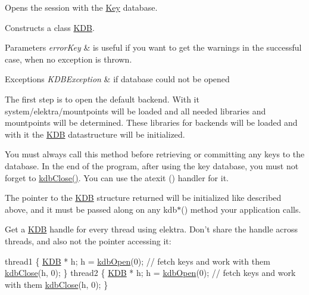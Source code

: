 Opens the session with the \hyperlink{classkdb_1_1Key}{Key} database.  

Constructs a class \hyperlink{classkdb_1_1KDB}{K\-D\-B}.


\begin{DoxyParams}{Parameters}
{\em error\-Key} & is useful if you want to get the warnings in the successful case, when no exception is thrown.\\
\hline
\end{DoxyParams}

\begin{DoxyExceptions}{Exceptions}
{\em K\-D\-B\-Exception} & if database could not be opened\\
\hline
\end{DoxyExceptions}
The first step is to open the default backend. With it system/elektra/mountpoints will be loaded and all needed libraries and mountpoints will be determined. These libraries for backends will be loaded and with it the {\ttfamily \hyperlink{classkdb_1_1KDB}{K\-D\-B}} datastructure will be initialized.

You must always call this method before retrieving or committing any keys to the database. In the end of the program, after using the key database, you must not forget to \hyperlink{group__kdb_gadb54dc9fda17ee07deb9444df745c96f}{kdb\-Close()}. You can use the atexit () handler for it.

The pointer to the {\ttfamily \hyperlink{classkdb_1_1KDB}{K\-D\-B}} structure returned will be initialized like described above, and it must be passed along on any kdb$\ast$() method your application calls.

Get a {\ttfamily \hyperlink{classkdb_1_1KDB}{K\-D\-B}} handle for every thread using elektra. Don't share the handle across threads, and also not the pointer accessing it\-: 
\begin{DoxyCode}
thread1
\{
        \hyperlink{classkdb_1_1KDB_a7e0637995ce9f294cdbc6f167df6db40}{KDB} * h;
        h = \hyperlink{group__kdb_ga6808defe5870f328dd17910aacbdc6ca}{kdbOpen}(0);
        \textcolor{comment}{// fetch keys and work with them}
        \hyperlink{group__kdb_gadb54dc9fda17ee07deb9444df745c96f}{kdbClose}(h, 0);
\}
thread2
\{
        \hyperlink{classkdb_1_1KDB_a7e0637995ce9f294cdbc6f167df6db40}{KDB} * h;
        h = \hyperlink{group__kdb_ga6808defe5870f328dd17910aacbdc6ca}{kdbOpen}(0);
        \textcolor{comment}{// fetch keys and work with them}
        \hyperlink{group__kdb_gadb54dc9fda17ee07deb9444df745c96f}{kdbClose}(h, 0);
\}
\end{DoxyCode}


